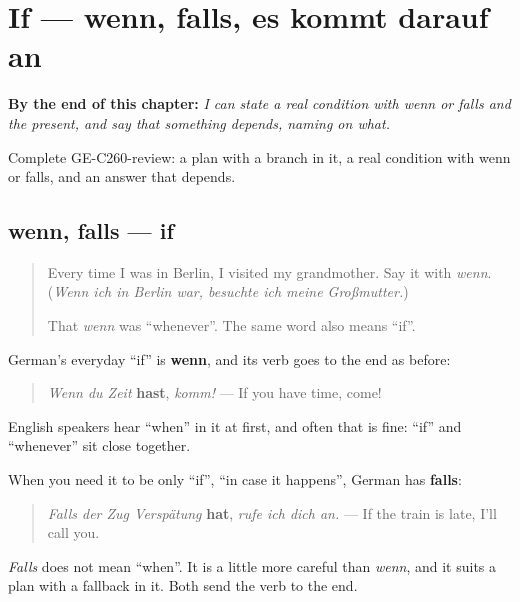 
\chapter{If — wenn, falls, es kommt darauf an}
\label{ch:ge-if}

\begin{chapteropening}
\textbf{By the end of this chapter:} \emph{I can state a real condition with wenn or falls and the present, and say that something depends, naming on what.}

Complete GE-C260-review: a plan with a branch in it, a real condition with wenn or falls, and an answer that depends.
\end{chapteropening}

\section[wenn, falls]{wenn, falls — if}

\label{lesson:GE-C260-wenn-falls}



\begin{quote}
Every time I was in Berlin, I visited my grandmother. Say it with \emph{wenn}. (\emph{Wenn ich in Berlin war, besuchte ich meine Großmutter.})

That \emph{wenn} was \textquotedblleft{}whenever\textquotedblright{}. The same word also means \textquotedblleft{}if\textquotedblright{}.
\end{quote}

\begin{grammarlens}[title={Grammar Lens: wenn for if}]
German's everyday \textquotedblleft{}if\textquotedblright{} is \textbf{wenn}, and its verb goes to the end as before:

\begin{quote}
\emph{Wenn du Zeit} \textbf{hast}, \emph{komm!} — If you have time, come!
\end{quote}

English speakers hear \textquotedblleft{}when\textquotedblright{} in it at first, and often that is fine: \textquotedblleft{}if\textquotedblright{} and \textquotedblleft{}whenever\textquotedblright{} sit close together.

When you need it to be only \textquotedblleft{}if\textquotedblright{}, \textquotedblleft{}in case it happens\textquotedblright{}, German has \textbf{falls}:

\begin{quote}
\emph{Falls der Zug Verspätung} \textbf{hat}, \emph{rufe ich dich an.} — If the train is late, I'll call you.
\end{quote}

\emph{Falls} does not mean \textquotedblleft{}when\textquotedblright{}. It is a little more careful than \emph{wenn}, and it suits a plan with a fallback in it. Both send the verb to the end.
\end{grammarlens}

